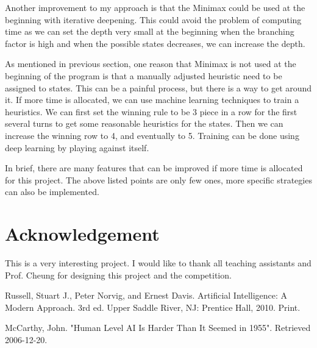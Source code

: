 \documentclass[a4paper,titlepage]{article}
\begin{document}
Another improvement to my approach is that the Minimax could be used at the beginning with iterative deepening. This could avoid the problem of computing time as we can set the depth very small at the beginning when the branching factor is high and when the possible states decreases, we can increase the depth.

As mentioned in previous section, one reason that Minimax is not used at the beginning of the program is that a manually adjusted heuristic need to be assigned to states. This can be a painful process, but there is a way to get around it. If more time is allocated, we can use machine learning techniques to train a heuristics. We can first set the winning rule to be 3 piece in a row for the first several turns to get some reasonable heuristics for the states. Then we can increase the winning row to 4, and eventually to 5. Training can be done using deep learning by playing against itself.

In brief, there are many features that can be improved if more time is allocated for this project. The above listed points are only few ones, more specific strategies can also be implemented. 

\section{Acknowledgement}
This is a very interesting project. I would like to thank all teaching assistants and Prof. Cheung for designing this project and the competition. 

\begin{thebibliography}{99}

Russell, Stuart J., Peter Norvig, and Ernest Davis. Artificial Intelligence: A Modern Approach. 3rd ed. Upper Saddle River, NJ: Prentice Hall, 2010. Print.

McCarthy, John. "Human Level AI Is Harder Than It Seemed in 1955". Retrieved 2006-12-20.


\end{thebibliography}
\end{document}
